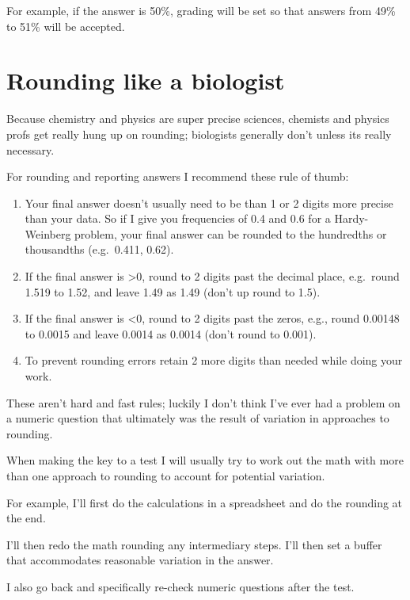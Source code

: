 \documentclass[
]{book}
\providecommand{\tightlist}{%
  \setlength{\itemsep}{0pt}\setlength{\parskip}{0pt}}
\begin{document}
For example, if the answer is 50\%, grading will be set so that answers from 49\% to 51\% will be accepted.

\hypertarget{rounding-like-a-biologist}{%
\section{Rounding like a biologist}\label{rounding-like-a-biologist}}

Because chemistry and physics are super precise sciences, chemists and physics profs get really hung up on rounding; biologists generally don't unless its really necessary.

For rounding and reporting answers I recommend these rule of thumb:

\begin{enumerate}
\def\labelenumi{\arabic{enumi}.}
\tightlist
\item
  Your final answer doesn't usually need to be than 1 or 2 digits more precise than your data. So if I give you frequencies of 0.4 and 0.6 for a Hardy-Weinberg problem, your final answer can be rounded to the hundredths or thousandths (e.g.~0.411, 0.62).
\item
  If the final answer is \textgreater0, round to 2 digits past the decimal place, e.g.~round 1.519 to 1.52, and leave 1.49 as 1.49 (don't up round to 1.5).
\item
  If the final answer is \textless0, round to 2 digits past the zeros, e.g., round 0.00148 to 0.0015 and leave 0.0014 as 0.0014 (don't round to 0.001).
\item
  To prevent rounding errors retain 2 more digits than needed while doing your work.
\end{enumerate}

These aren't hard and fast rules; luckily I don't think I've ever had a problem on a numeric question that ultimately was the result of variation in approaches to rounding.

When making the key to a test I will usually try to work out the math with more than one approach to rounding to account for potential variation.

For example, I'll first do the calculations in a spreadsheet and do the rounding at the end.

I'll then redo the math rounding any intermediary steps. I'll then set a buffer that accommodates reasonable variation in the answer.

I also go back and specifically re-check numeric questions after the test.
\end{document}
